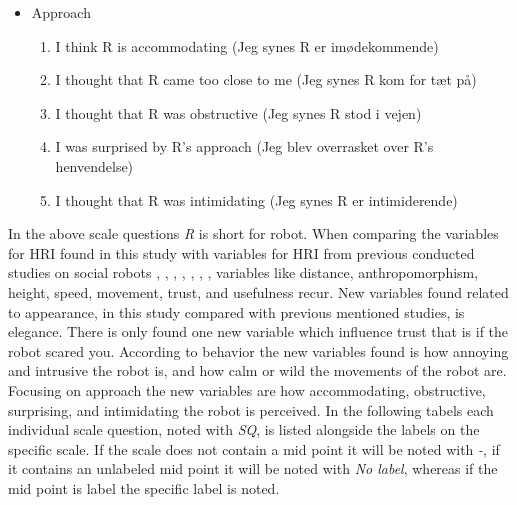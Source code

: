 \begin{itemize}
\begin{enumerate}
\end{enumerate}
\item Approach 
\begin{enumerate}
  \item I think R is accommodating (Jeg synes R er imødekommende)
  \item I thought that R came too close to me (Jeg synes R kom for tæt på)
  \item I thought that R was obstructive (Jeg synes R stod i vejen)
  \item I was surprised by R's approach (Jeg blev overrasket over R's henvendelse)
  \item I thought that R was intimidating (Jeg synes R er intimiderende)\\
\end{enumerate}
\end{itemize}
%
In the above scale questions \textit{R} is short for robot. When comparing the variables for HRI found in this study with variables for HRI from previous conducted studies on social robots \cite{PDF:ExploringInfluencingVariable}, \cite{PDF:SharingALifeHarvey}, \cite{PDF:InTheCompanyofRobots}, \cite{PDF:CloseButNotStuck}, \cite{PDF:TheImpactOfTraveler}, \cite{PDF:HumanRobotEmodiedInteraction}, \cite{PDF:RecommendationEffects}, variables like distance, anthropomorphism, height, speed, movement, trust, and usefulness recur. New variables found related to appearance, in this study compared with previous mentioned studies, is elegance. There is only found one new variable which influence trust that is if the robot scared you. According to behavior the new variables found is how annoying and intrusive the robot is, and how calm or wild the movements of the robot are. Focusing on approach the new variables are how accommodating, obstructive, surprising, and intimidating the robot is perceived. In the following tabels each individual scale question, noted with \textit{SQ}, is listed alongside the labels on the specific scale. If the scale does not contain a mid point it will be noted with \textit{-}, if it contains an unlabeled mid point it will be noted with \textit{No label}, whereas if the mid point is label the specific label is noted. 
%
